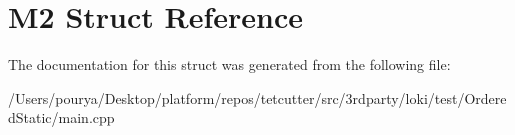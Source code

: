 \hypertarget{structM2}{}\section{M2 Struct Reference}
\label{structM2}


The documentation for this struct was generated from the following file\+:\begin{DoxyCompactItemize}
\item 
/\+Users/pourya/\+Desktop/platform/repos/tetcutter/src/3rdparty/loki/test/\+Ordered\+Static/main.\+cpp\end{DoxyCompactItemize}
